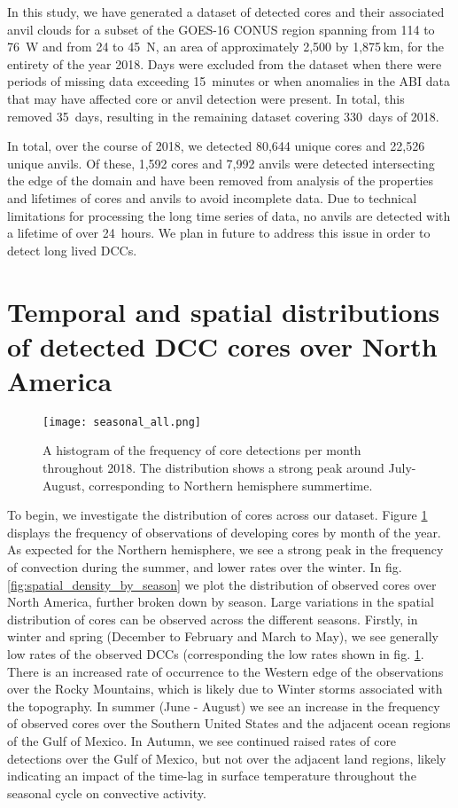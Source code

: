 In this study, we have generated a dataset of detected cores and their associated anvil clouds for a subset of the GOES-16 CONUS region spanning from 114 to 76\textdegree~W and from 24 to 45\textdegree~N, an area of approximately 2,500 by 1,875\,\unit{km}, for the entirety of the year 2018.
Days were excluded from the dataset when there were periods of missing data exceeding 15~minutes or when anomalies in the ABI data that may have affected core or anvil detection were present.
In total, this removed 35~days, resulting in the remaining dataset covering 330~days of 2018.

In total, over the course of 2018, we detected 80,644 unique cores and 22,526 unique anvils.
Of these, 1,592 cores and 7,992 anvils were detected intersecting the edge of the domain and have been removed from analysis of the properties and lifetimes of cores and anvils to avoid incomplete data.
Due to technical limitations for processing the long time series of data, no anvils are detected with a lifetime of over 24~hours.
We plan in future to address this issue in order to detect long lived DCCs.


\section{Temporal and spatial distributions of detected DCC cores over North America}

\begin{figure}[t]
    \centering
    \texttt{[image: seasonal\_all.png]}
    \caption{A histogram of the frequency of core detections per month throughout 2018. The distribution shows a strong peak around July-August, corresponding to Northern hemisphere summertime.}
    \label{fig:seasonal_dist}
\end{figure}

To begin, we investigate the distribution of cores across our dataset.
Figure \ref{fig:seasonal_dist} displays the frequency of observations of developing cores by month of the year.
As expected for the Northern hemisphere, we see a strong peak in the frequency of convection during the summer, and lower rates over the winter.
In fig. \ref{fig:spatial_density_by_season} we plot the distribution of observed cores over North America, further broken down by season.
Large variations in the spatial distribution of cores can be observed across the different seasons.
Firstly, in winter and spring (December to February and March to May), we see generally low rates of the observed DCCs (corresponding the low rates shown in fig. \ref{fig:seasonal_dist}.
There is an increased rate of occurrence to the Western edge of the observations over the Rocky Mountains, which is likely due to Winter storms associated with the topography.
In summer (June - August) we see an increase in the frequency of observed cores over the Southern United States and the adjacent ocean regions of the Gulf of Mexico.
In Autumn, we see continued raised rates of core detections over the Gulf of Mexico, but not over the adjacent land regions, likely indicating an impact of the time-lag in surface temperature throughout the seasonal cycle on convective activity.

